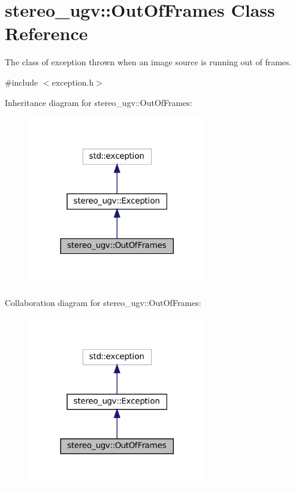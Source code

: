 \hypertarget{classstereo__ugv_1_1OutOfFrames}{}\section{stereo\+\_\+ugv\+:\+:Out\+Of\+Frames Class Reference}
\label{classstereo__ugv_1_1OutOfFrames}


The class of exception thrown when an image source is running out of frames.  




{\ttfamily \#include $<$exception.\+h$>$}



Inheritance diagram for stereo\+\_\+ugv\+:\+:Out\+Of\+Frames\+:
\nopagebreak
\begin{figure}[H]
\begin{center}
\leavevmode
\includegraphics[width=221pt]{classstereo__ugv_1_1OutOfFrames__inherit__graph}
\end{center}
\end{figure}


Collaboration diagram for stereo\+\_\+ugv\+:\+:Out\+Of\+Frames\+:
\nopagebreak
\begin{figure}[H]
\begin{center}
\leavevmode
\includegraphics[width=221pt]{classstereo__ugv_1_1OutOfFrames__coll__graph}
\end{center}
\end{figure}
